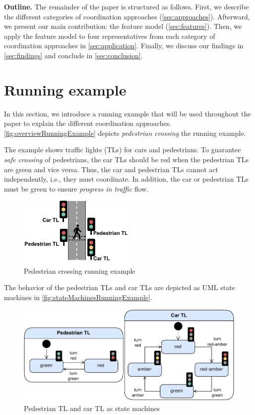 \documentclass[runningheads]{llncs}
\begin{document}
\textbf{Outline.} The remainder of the paper is structured as follows.
First, we describe the different categories of coordination approaches (\autoref{sec:approaches}).
Afterward, we present our main contribution: the feature model (\autoref{sec:features}).
Then, we apply the feature model to four representatives from each category of coordination approaches in \autoref{sec:application}.
Finally, we discuss our findings in \autoref{sec:findings} and conclude in \autoref{sec:conclusion}.


\section{Running example}
In this section, we introduce a running example that will be used throughout the paper to explain the different coordination approaches.
\autoref{fig:overviewRunningExample} depicts \textit{pedestrian crossing} the running example.

The example shows traffic lights (TLs) for cars and pedestrians.
To guarantee \textit{safe crossing} of pedestrians, the car TLs should be red when the pedestrian TLs are green and vice versa.
Thus, the car and pedestrian TLs cannot act independently, i.e., they must coordinate.
In addition, the car or pedestrian TLs must be green to ensure \textit{progress in traffic} flow.

\begin{figure}[ht]
	\centering
	\includegraphics[width=0.5\textwidth]{images/running_example_schematic}
	\caption{Pedestrian crossing running example}
	\label{fig:overviewRunningExample}
\end{figure}

The behavior of the pedestrian TLs and car TLs are depicted as UML state machines \cite{objectmanagementgroupUnifiedModelingLanguage2017} in \autoref{fig:stateMachinesRunningExample}.

\begin{figure}[ht]
	\centering
	\includegraphics[width=1\textwidth]{images/running_example_models}
	\caption{Pedestrian TL and car TL as state machines}
	\label{fig:stateMachinesRunningExample}
\end{figure}
\end{document}

